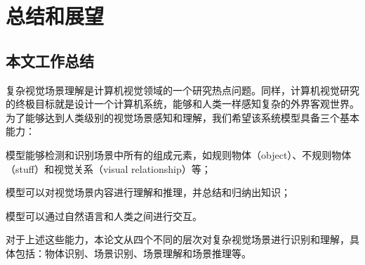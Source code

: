 \chapter{总结和展望}

\section{本文工作总结}

复杂视觉场景理解是计算机视觉领域的一个研究热点问题。同样，计算机视觉研究的终极目标就是设计一个计算机系统，能够和人类一样感知复杂的外界客观世界。为了能够达到人类级别的视觉场景感知和理解，我们希望该系统模型具备三个基本能力：
\begin{asparaenum}
\item 模型能够检测和识别场景中所有的组成元素，如规则物体（object）、不规则物体（stuff）和视觉关系（visual relationship）等；

\item 模型可以对视觉场景内容进行理解和推理，并总结和归纳出知识；

\item 模型可以通过自然语言和人类之间进行交互。
\end{asparaenum}

对于上述这些能力，本论文从四个不同的层次对复杂视觉场景进行识别和理解，具体包括：物体识别、场景识别、场景理解和场景推理等。

